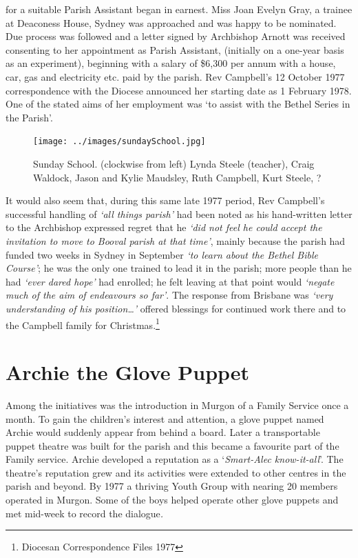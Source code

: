 for a suitable Parish Assistant began in earnest. Miss Joan Evelyn Gray, a trainee at Deaconess House, Sydney was approached and was happy to be nominated. Due process was followed and a letter signed by Archbishop Arnott was received consenting to her appointment as Parish Assistant, (initially on a one-year basis as an experiment), beginning with a salary of \$6,300 per annum with a house, car, gas and electricity etc. paid by the parish. Rev Campbell's 12 October 1977 correspondence with the Diocese announced her starting date as 1 February 1978. One of the stated aims of her employment was `to assist with the Bethel Series in the Parish'.









\begin{figure}[!htb]
\begin{center}
\texttt{[image: ../images/sundaySchool.jpg]}
\caption{Sunday School. (clockwise from left) Lynda Steele (teacher), Craig Waldock, Jason and Kylie Maudsley, Ruth Campbell, Kurt Steele, ?}
\end{center}
\end{figure}




It would also seem that, during this same late 1977 period, Rev Campbell's successful handling of \emph{`all things parish'} had been noted as his hand-written letter to the Archbishop expressed regret that he \emph{`did not feel he could accept the invitation to move to Booval parish at that time'}, mainly because the parish had funded two weeks in Sydney in September \emph{`to learn about the Bethel Bible Course'}; he was the only one trained to lead it in the parish; more people than he had \emph{`ever dared hope'} had enrolled; he felt leaving at that point would \emph{`negate much of the aim of endeavours so far'}. The response from Brisbane was \emph{`very understanding of his position\ldots'} offered blessings for continued work there and to the Campbell family for Christmas.\footnote{Diocesan Correspondence Files 1977}


\section{Archie the Glove Puppet}



Among the initiatives was the introduction in Murgon of a Family Service once a month. To gain the children's interest and attention, a glove puppet named Archie would suddenly appear from behind a board. Later a transportable puppet theatre was built for the parish and this became a favourite part of the Family service. Archie developed a reputation as a `\emph{Smart-Alec know-it-all}'. The theatre's reputation grew and its activities were extended to other centres in the parish and beyond. By 1977 a thriving Youth Group with nearing 20 members operated in Murgon. Some of the boys helped operate other glove puppets and met mid-week to record the dialogue\emph{.}



